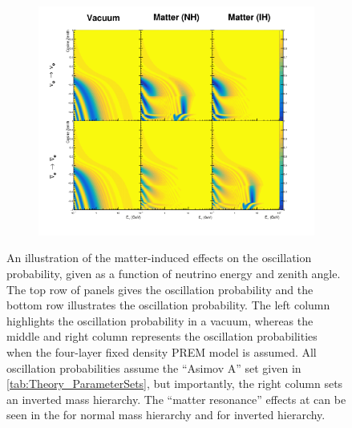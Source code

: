 \begin{figure}[h]
  \begin{subfigure}[t]{\textwidth}
    \includegraphics[width=\textwidth, trim={0mm 0mm 0mm 0mm}, clip,page=1]{Figures/Oscillation/MatterEffect.pdf}
  \end{subfigure}
  \caption{An illustration of the matter-induced effects on the oscillation probability, given as a function of neutrino energy and zenith angle. The top row of panels gives the  oscillation probability and the bottom row illustrates the  oscillation probability. The left column highlights the oscillation probability in a vacuum, whereas the middle and right column represents the oscillation probabilities when the four-layer fixed density PREM model is assumed. All oscillation probabilities assume the ``Asimov A'' set given in \autoref{tab:Theory_ParameterSets}, but importantly, the right column sets an inverted mass hierarchy. The ``matter resonance'' effects at  can be seen in the  for normal mass hierarchy and  for inverted hierarchy.}
  \label{fig:Oscillation_SK_VacuumMatter}
\end{figure}

